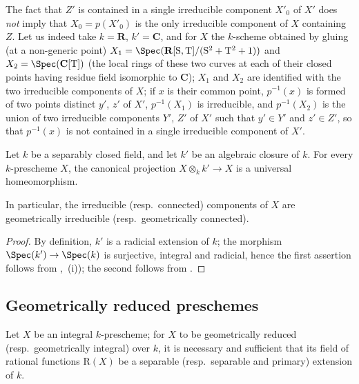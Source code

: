 \begin{remark}[4.5.20]
\label{IV.4.5.20}
The fact that $Z'$ is contained in a single irreducible component $X'_0$ of $X'$ does \emph{not} imply that $X_0=p(X'_0)$ is the only irreducible component of $X$ containing $Z$.
Let us indeed take $k=\mathbf{R}$, $k'=\mathbf{C}$, and for $X$ the $k$-scheme obtained by gluing (at a non-generic point) $X_1=\Spec(\mathbf{R}[\mathrm{S},\mathrm{T}]/(\mathrm{S}^2+\mathrm{T}^2+1))$ and $X_2=\Spec(\mathbf{C}[\mathrm{T}])$ (the local rings of these two curves at each of their closed points having residue field isomorphic to $\mathbf{C}$); $X_1$ and $X_2$ are identified with the two irreducible components of $X$; if $x$ is their common point, $p^{-1}(x)$ is formed of two points distinct $y'$, $z'$ of $X'$, $p^{-1}(X_1)$ is irreducible, and $p^{-1}(X_2)$ is the union of two irreducible components $Y'$, $Z'$ of $X'$ such that $y'\in Y'$ and $z'\in Z'$, so that $p^{-1}(x)$ is not contained in a single irreducible component of $X'$.
\end{remark}

\begin{proposition}[4.5.21]
\label{IV.4.5.21}
Let $k$ be a separably closed field, and let $k'$ be an algebraic closure of $k$.
For every $k$-prescheme $X$, the canonical projection $X\otimes_k k'\to X$ is a universal homeomorphism.
\end{proposition}

In particular, the irreducible (resp.\ connected) components of $X$ are geometrically irreducible (resp.\ geometrically connected).

\begin{proof}
By definition, $k'$ is a radicial extension of $k$; the morphism $\Spec(k')\to\Spec(k)$ is surjective, integral and radicial, hence the first assertion follows from ,~(i)); the second follows from .
\end{proof}
\subsection{Geometrically reduced preschemes}
\label{subsection:IV.4.6}


\begin{corollary}[4.6.3]
\label{IV.4.6.3}
Let $X$ be an integral $k$-prescheme; for $X$ to be geometrically reduced (resp.\ geometrically integral) over $k$, it is necessary and sufficient that its field of rational functions $\mathrm{R}(X)$ be a separable (resp.\ separable and primary) extension of $k$.
\end{corollary}

